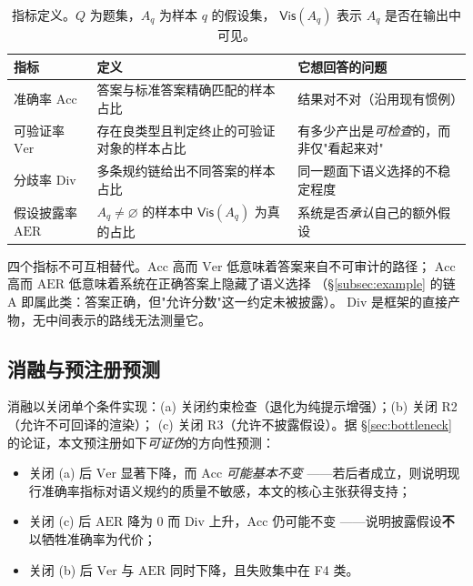 \documentclass[11pt]{article}
\begin{document}
\begin{table}[t]
\centering
\small
\caption{指标定义。$Q$ 为题集，$A_q$ 为样本 $q$ 的假设集，
$\mathsf{Vis}(A_q)$ 表示 $A_q$ 是否在输出中可见。}
\label{tab:metrics}
\begin{tabular}{@{}p{2.2cm}p{6.2cm}p{5.4cm}@{}}
\toprule
指标 & 定义 & 它想回答的问题 \\
\midrule
准确率 $\mathrm{Acc}$ & 答案与标准答案精确匹配的样本占比 & 结果对不对（沿用现有惯例） \\
可验证率 $\mathrm{Ver}$ &
存在良类型且判定终止的可验证对象的样本占比 &
有多少产出是\emph{可检查}的，而非仅"看起来对" \\
分歧率 $\mathrm{Div}$ &
多条规约链给出不同答案的样本占比 &
同一题面下语义选择的不稳定程度 \\
假设披露率 $\mathrm{AER}$ &
$A_q \neq \varnothing$ 的样本中 $\mathsf{Vis}(A_q)$ 为真的占比 &
系统是否\emph{承认}自己的额外假设 \\
\bottomrule
\end{tabular}
\end{table}

四个指标不可互相替代。$\mathrm{Acc}$ 高而 $\mathrm{Ver}$ 低意味着答案来自不可审计的路径；
$\mathrm{Acc}$ 高而 $\mathrm{AER}$ 低意味着系统在正确答案上隐藏了语义选择
（\S\ref{subsec:example} 的链 A 即属此类：答案正确，但"允许分数"这一约定未被披露）。
$\mathrm{Div}$ 是框架的直接产物，无中间表示的路线无法测量它。

\subsection{消融与预注册预测}
消融以关闭单个条件实现：(a) 关闭约束检查（退化为纯提示增强）；(b) 关闭 R2（允许不可回译的渲染）；
(c) 关闭 R3（允许不披露假设）。据 \S\ref{sec:bottleneck} 的论证，本文预注册如下\emph{可证伪}的方向性预测：

\begin{itemize}[leftmargin=1.6em,itemsep=2pt]
\item 关闭 (a) 后 $\mathrm{Ver}$ 显著下降，而 $\mathrm{Acc}$ \emph{可能基本不变}
——若后者成立，则说明现行准确率指标对语义规约的质量不敏感，本文的核心主张获得支持；
\item 关闭 (c) 后 $\mathrm{AER}$ 降为 $0$ 而 $\mathrm{Div}$ 上升，$\mathrm{Acc}$ 仍可能不变
——说明披露假设\textbf{不}以牺牲准确率为代价；
\item 关闭 (b) 后 $\mathrm{Ver}$ 与 $\mathrm{AER}$ 同时下降，且失败集中在 F4 类。
\end{itemize}
\end{document}
